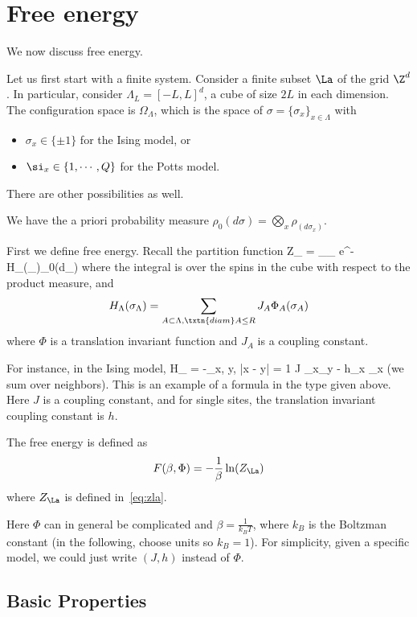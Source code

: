 

\section{Free energy}

We now discuss free energy. 

Let us first start with a finite system. Consider a finite subset $\La$ of the grid $\Z^d$. In particular, consider $\Lambda_L = [-L, L]^d$, a cube of size $2L$ in each dimension. The configuration space is $\Omega_{\Lambda}$, which is the space of $\sigma=\{\sigma_x\}_{x \in \Lambda}$ with 
\begin{itemize}
\item
$\sigma_x \in \{\pm 1\}$ for the Ising model, or 
\item $\si_x\in \{1, \cdots, Q\}$ for the Potts model. 
\end{itemize}
There are other possibilities as well. 

We have the a priori probability measure $\rho_0(d\sigma) = \bigotimes_x \rho_(d\sigma_x)$. 

First we define free energy. Recall the  partition function
Z_{\Lambda} = \int_{\Omega_\La} e^{-\beta H_{\Lambda}(\sigma_{\Lambda})}\rho_0(d\sigma_\La)
\eeq
where the integral is over the spins in the cube with respect to the product measure, and 
\[
H_{\Lambda}(\sigma_{\Lambda}) = \sum_{A \subset \Lambda, \txtn{diam} A \leq R} J_A \Phi_{A}(\sigma_A)
\]
where $\Phi$ is a translation invariant function and $J_A$ is a coupling constant.  

For instance, in the Ising model, 
H_{\Lambda} = -\sum_{x, y, |x - y| = 1} J \sigma_x\sigma_y - h\sum_x \sigma_x
\eeq 
(we sum over neighbors). This is an example of a formula in the type given above. Here $J$ is a coupling constant, and for single sites, the translation invariant coupling constant is $h$.  

\begin{df}
The free energy is defined as 
\[
F(\beta, \Phi) = -\frac{1}{\beta}\ln(Z_\La)
\]
where $Z_{\La}$ is defined in~\eqref{eq:zla}.
\end{df}
Here $\Phi$ can in general be complicated and $\beta = \frac{1}{k_{B}T}$, where $k_{B}$ is the Boltzman constant (in the following, choose units so $k_B=1$). For simplicity, given a specific model, we could just write $(J, h)$ instead of $\Phi$. 


\subsection{Basic Properties}

